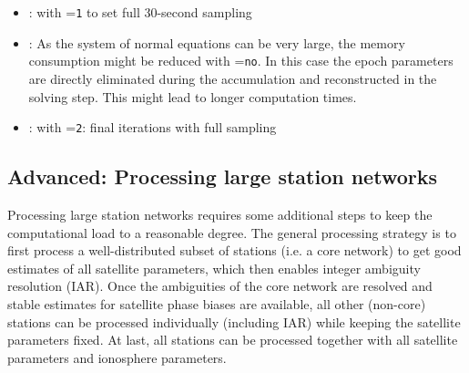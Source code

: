 \begin{itemize}
      \item {}: with =\verb|1| to set full 30-second sampling
      \item {}: As the system of normal
      equations can be very large, the memory consumption might be reduced with =\verb|no|.
      In this case the epoch parameters are directly eliminated during the accumulation and reconstructed in the solving step.
      This might lead to longer computation times.
      \item {}: with =\verb|2|: final iterations with full sampling
\end{itemize}

\subsection{Advanced: Processing large station networks}\label{cookbook.gnssNetwork:advanced}

Processing large station networks requires some additional steps to keep the computational load to a reasonable degree.
The general processing strategy is to first process a well-distributed subset of stations (i.e. a core network)
to get good estimates of all satellite parameters, which then enables integer ambiguity resolution (IAR). Once
the ambiguities of the core network are resolved and stable estimates for satellite phase biases are available, all
other (non-core) stations can be processed individually (including IAR) while keeping the satellite parameters fixed.
At last, all stations can be processed together with all satellite parameters and ionosphere parameters.

